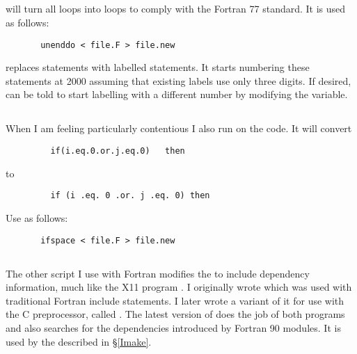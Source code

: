\subsection{}
 will turn all  loops into
 loops to comply with the Fortran 77 standard.  It is
used as follows:
\begin{verbatim}
       unenddo < file.F > file.new
\end{verbatim}
 replaces  statements with labelled
 statements.  It starts numbering these statements at
2000 assuming that existing labels use only three digits.  If
desired,  can be told to start labelling with a
different number by modifying the 
variable.

\subsection{}
When I am feeling particularly contentious I also run  on
the code.  It will convert
\begin{verbatim}
         if(i.eq.0.or.j.eq.0)   then
\end{verbatim}
to
\begin{verbatim}
         if (i .eq. 0 .or. j .eq. 0) then
\end{verbatim}
Use as follows:
\begin{verbatim}
       ifspace < file.F > file.new
\end{verbatim}

\subsection{}
The other  script I use with Fortran modifies the
 to include dependency information, much like the X11
program .  I originally wrote  which
was used with traditional Fortran include statements.
I later wrote a variant of it for use with the C preprocessor,
called .  The latest version of
 does the job of both programs and also searches for
the dependencies introduced by Fortran 90 modules.  It is used by the
 described in \S\ref{Imake}.

